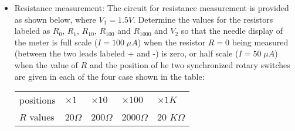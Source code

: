 \begin{enumerate}
\begin{itemize}


    \item Resistance measurement: The circuit for resistance measurement is
      provided as shown below, where $V_1=1.5V$. Determine the values for the 
      resistors labeled as $R_0$, $R_1$, $R_{10}$, $R_{100}$ and $R_{1000}$ 
      and $V_2$ so that the needle display of the meter is full scale 
      ($I=100\;\mu A$) when the resistor $R=0$ being measured (between the 
      two leads labeled + and -) is zero, or half scale ($I=50\;\mu A$) when 
      the value of $R$ and the position of he two synchronized rotary switches
      are given in each of the four case shown in the table:

      \begin{tabular}{l|llll} \hline
	positions  & $\times 1$ & $\times 10$ & $\times 100$ & $\times 1K$ \\
	$R$ values & 20$\Omega$ & 200$\Omega$ & 2000$\Omega$ & 20 $K\Omega$ 
      \end{tabular}


%
     

\end{itemize}
\end{enumerate}
